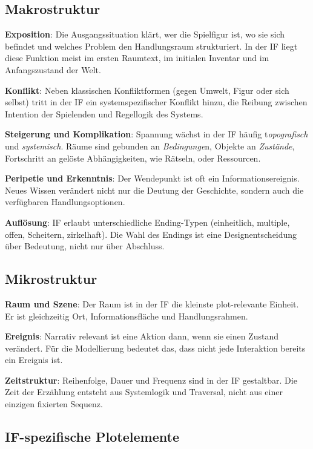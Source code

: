 \documentclass[parskip=half,a4paper,11pt]{scrreprt}
\begin{document}
\subsection{Makrostruktur}

\textbf{Exposition}: Die Ausgangssituation klärt, wer die Spielfigur ist, wo sie sich befindet und welches Problem den Handlungsraum strukturiert. In der IF liegt diese Funktion meist im ersten Raumtext, im initialen Inventar und im Anfangszustand der Welt.

\textbf{Konflikt}: Neben klassischen Konfliktformen (gegen Umwelt, Figur oder sich selbst) tritt in der IF ein systemspezifischer Konflikt hinzu, die Reibung zwischen Intention der Spielenden und Regellogik des Systems.

\textbf{Steigerung und Komplikation}: Spannung wächst in der IF häufig t\textit{opografisch} und \textit{systemisch}. Räume sind gebunden an \textit{Bedingunge}n, Objekte an \textit{Zustände}, Fortschritt an gelöste Abhängigkeiten, wie Rätseln, oder Ressourcen.

\textbf{Peripetie und Erkenntnis}: Der Wendepunkt ist oft ein Informationsereignis. Neues Wissen verändert nicht nur die Deutung der Geschichte, sondern auch die verfügbaren Handlungsoptionen.

\textbf{Auflösung}: IF erlaubt unterschiedliche Ending-Typen (einheitlich, multiple, offen, Scheitern, zirkelhaft). Die Wahl des Endings ist eine Designentscheidung über Bedeutung, nicht nur über Abschluss.

\subsection{Mikrostruktur}

\textbf{Raum und Szene}: Der Raum ist in der IF die kleinste plot-relevante Einheit. Er ist gleichzeitig Ort, Informationsfläche und Handlungsrahmen.

\textbf{Ereignis}: Narrativ relevant ist eine Aktion dann, wenn sie einen Zustand verändert. Für die Modellierung bedeutet das, dass nicht jede Interaktion bereits ein Ereignis ist.

\textbf{Zeitstruktur}: Reihenfolge, Dauer und Frequenz sind in der IF gestaltbar. Die Zeit der Erzählung entsteht aus Systemlogik und Traversal, nicht aus einer einzigen fixierten Sequenz.

\subsection{IF-spezifische Plotelemente}
\end{document}

